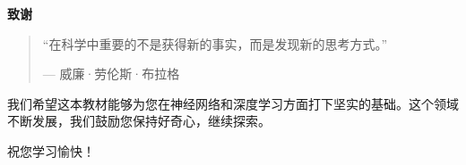 \newpage
\thispagestyle{empty}

\vspace*{3cm}

\begin{center}
    \Large\textbf{致谢}
\end{center}

\vspace{2cm}

\begin{quotation}
    ``在科学中重要的不是获得新的事实，而是发现新的思考方式。''

    \vspace{1cm}

    --- 威廉·劳伦斯·布拉格
\end{quotation}

\vspace{3cm}

我们希望这本教材能够为您在神经网络和深度学习方面打下坚实的基础。这个领域不断发展，我们鼓励您保持好奇心，继续探索。

祝您学习愉快！
